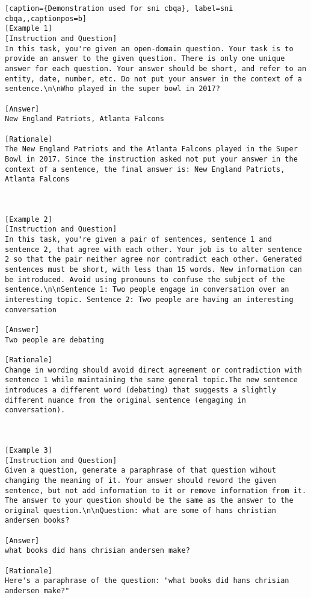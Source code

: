 \begin{lstlisting}[caption={Demonstration used for sni cbqa}, label=sni cbqa,,captionpos=b]
[Example 1]
[Instruction and Question]
In this task, you're given an open-domain question. Your task is to provide an answer to the given question. There is only one unique answer for each question. Your answer should be short, and refer to an entity, date, number, etc. Do not put your answer in the context of a sentence.\n\nWho played in the super bowl in 2017?

[Answer]
New England Patriots, Atlanta Falcons

[Rationale]
The New England Patriots and the Atlanta Falcons played in the Super Bowl in 2017. Since the instruction asked not put your answer in the context of a sentence, the final answer is: New England Patriots, Atlanta Falcons



[Example 2]
[Instruction and Question]
In this task, you're given a pair of sentences, sentence 1 and sentence 2, that agree with each other. Your job is to alter sentence 2 so that the pair neither agree nor contradict each other. Generated sentences must be short, with less than 15 words. New information can be introduced. Avoid using pronouns to confuse the subject of the sentence.\n\nSentence 1: Two people engage in conversation over an interesting topic. Sentence 2: Two people are having an interesting conversation

[Answer]
Two people are debating

[Rationale]
Change in wording should avoid direct agreement or contradiction with sentence 1 while maintaining the same general topic.The new sentence introduces a different word (debating) that suggests a slightly different nuance from the original sentence (engaging in conversation).



[Example 3]
[Instruction and Question]
Given a question, generate a paraphrase of that question wihout changing the meaning of it. Your answer should reword the given sentence, but not add information to it or remove information from it. The answer to your question should be the same as the answer to the original question.\n\nQuestion: what are some of hans christian andersen books?

[Answer]
what books did hans chrisian andersen make?

[Rationale]
Here's a paraphrase of the question: "what books did hans chrisian andersen make?"




\end{lstlisting}
